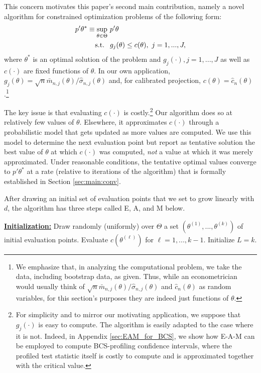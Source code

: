 \documentclass[letterpaper,11pt]{article}
\theoremstyle{myplain}
\theoremstyle{mydefinition}
\theoremstyle{myremark}
\numberwithin{equation}{section}
\numberwithin{figure}{section}
\begin{document}
This concern motivates this paper's second main contribution, namely a novel algorithm for constrained optimization problems of the following form:
\begin{align}
p'\theta^*\equiv \sup_{\theta\in\Theta}&~ p'\theta\notag\\
\text{s.t. }&~	g_j(\theta)\le c(\theta),~j=1,..., J,\label{eq:general_problem}
\end{align}
where $\theta^*$ is an optimal solution of the problem and $g_j(\cdot),j=1,...,J$ as well as $c(\cdot)$ are fixed functions of $\theta$. In our own application, $g_j(\theta)=\sqrt n\bar m_{n,j}(\theta)/\hat \sigma_{n,j}(\theta)$ and, for calibrated projection, $c(\theta)=\hat c_n(\theta)$.\footnote{\label{fn:stochastic}We emphasize that, in analyzing the computational problem, we take the data, including bootstrap data, as given. Thus, while an econometrician would usually think of $\sqrt n\bar m_{n,j}(\theta)/\hat \sigma_{n,j}(\theta)$ and $\hat c_n(\theta)$ as random variables, for this section's purposes they are indeed just functions of $\theta$.}

The key issue is that evaluating $c(\cdot)$ is costly.\footnote{For simplicity and to mirror our motivating application, we suppose that $g_j(\cdot)$ is easy to compute. The algorithm is easily adapted to the case where it is not. Indeed, in Appendix \ref{sec:EAM_for_BCS}, we show how E-A-M can be employed to compute BCS-profiling confidence intervals, where the profiled test statistic itself is costly to compute and is approximated together with the critical value.} Our algorithm does so at relatively few values of $\theta$. Elsewhere, it approximates $c(\cdot)$ through a probabilistic model that gets updated as more values are computed. We use this model to determine the next evaluation point but report as tentative solution the best value of $\theta$ at which $c(\cdot)$ was computed, \textit{not} a value at which it was merely approximated. Under reasonable conditions, the tentative optimal values converge to $p'\theta^*$ at a rate (relative to iterations of the algorithm)  that is formally established in Section \ref{sec:main:conv}.


After drawing an initial set of evaluation points that we set to grow linearly with $d$, the algorithm has three steps called E, A, and M below. 
\medskip

\noindent\underline{\textbf{Initialization:}} Draw randomly (uniformly) over $\Theta$ a set $(\theta^{(1)},...,\theta^{(k)})$ of initial evaluation points. Evaluate $c(\theta^{(\ell)})$ for $\ell=1,...,k-1$. Initialize $L=k$.
\medskip
\end{document}
